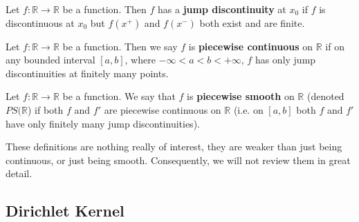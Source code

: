 \begin{defn}
Let $f:\mathbb{R}\to\mathbb{R}$ be a function. Then $f$ has
a \textbf{jump discontinuity} at $x_{0}$ if $f$ is
discontinuous at $x_{0}$ but $f(x^+)$ and $f(x^-)$ both
exist and are finite.
\end{defn}

\begin{defn}
Let $f:\mathbb{R}\to\mathbb{R}$ be a function. Then we say
$f$ is \textbf{piecewise continuous} on $\mathbb{R}$ if on
any bounded interval $[a,b]$, where $-\infty<a<b<+\infty$,
$f$ has only jump discontinuities at finitely many
points.
\end{defn}

\begin{defn}
Let $f:\mathbb{R}\to\mathbb{R}$ be a function. We say that
$f$ is \textbf{piecewise smooth} 
on $\mathbb{R}$ (denoted $PS(\mathbb{R}$) if both
$f$ and $f'$ are piecewise continuous on $\mathbb{R}$
(i.e. on $[a,b]$ both $f$ and $f'$ have only finitely many
jump discontinuities).
\end{defn}

These definitions are nothing really of interest, they are
weaker than just being continuous, or just being
smooth. Consequently, we will not review them in great
detail.

\subsection{Dirichlet Kernel}

